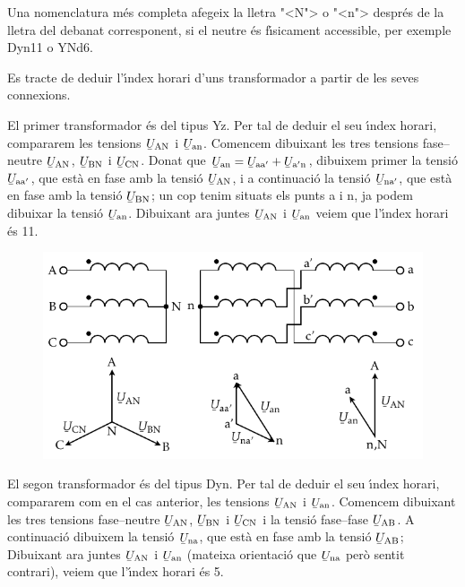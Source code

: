 Una nomenclatura m\'{e}s completa afegeix la lletra {"<}N{">} o {"<}n{">} despr\'{e}s de la lletra del debanat corresponent, si el neutre \'{e}s f\'{\i}sicament accessible, per exemple Dyn11 o YNd6.

\begin{exemple}
    Es tracte de deduir l'\'{\i}ndex horari d'uns transformador a partir de les seves connexions.

    El primer transformador \'{e}s del tipus Yz. Per tal de deduir el seu \'{\i}ndex horari, compararem les tensions
    $\cmplx{U}\ped{AN}$ i $\cmplx{U}\ped{an}$. Comencem dibuixant les tres tensions fase--neutre $\cmplx{U}\ped{AN}$, $\cmplx{U}\ped{BN}$ i $\cmplx{U}\ped{CN}$. Donat que $\cmplx{U}\ped{an} = \cmplx{U}\ped{aa'} + \cmplx{U}\ped{a'n}$, dibuixem primer la tensi\'{o} $\cmplx{U}\ped{aa'}$, que est\`{a} en fase amb la tensi\'{o} $\cmplx{U}\ped{AN}$, i a continuaci\'{o} la tensi\'{o} $\cmplx{U}\ped{na'}$, que est\`{a} en fase amb la tensi\'{o} $\cmplx{U}\ped{BN}$; un cop tenim situats els punts a i n, ja podem dibuixar la tensi\'{o} $\cmplx{U}\ped{an}$. Dibuixant ara juntes $\cmplx{U}\ped{AN}$ i $\cmplx{U}\ped{an}$  veiem que l'\'{\i}ndex horari \'{e}s 11.

    \begin{figure}[!h]
    \centering
        \includegraphics{Imatges/Cap-TrafosPot-Exemple-Yz.pdf}
    \end{figure}

     El segon transformador \'{e}s del tipus Dyn. Per tal de deduir el seu \'{\i}ndex horari, compararem com en el cas anterior, les tensions $\cmplx{U}\ped{AN}$ i $\cmplx{U}\ped{an}$. Comencem dibuixant les tres tensions fase--neutre $\cmplx{U}\ped{AN}$, $\cmplx{U}\ped{BN}$ i $\cmplx{U}\ped{CN}$ i la tensi\'{o} fase--fase $\cmplx{U}\ped{AB}$.  A continuaci\'{o} dibuixem la tensi\'{o} $\cmplx{U}\ped{na}$, que est\`{a} en fase amb la tensi\'{o} $\cmplx{U}\ped{AB}$; Dibuixant ara juntes $\cmplx{U}\ped{AN}$ i $\cmplx{U}\ped{an}$ (mateixa orientaci\'{o} que $\cmplx{U}\ped{na}$ per\`{o} sentit contrari),  veiem que l'\'{\i}ndex horari \'{e}s 5.


\end{exemple}
